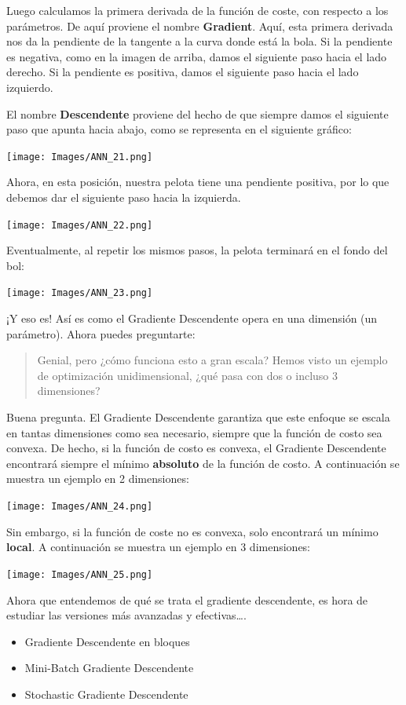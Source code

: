 \documentclass[
]{book}
\providecommand{\tightlist}{%
  \setlength{\itemsep}{0pt}\setlength{\parskip}{0pt}}
\begin{document}
Luego calculamos la primera derivada de la función de coste, con respecto a los parámetros. De aquí proviene el nombre \textbf{Gradient}. Aquí, esta primera derivada nos da la pendiente de la tangente a la curva donde está la bola. Si la pendiente es negativa, como en la imagen de arriba, damos el siguiente paso hacia el lado derecho. Si la pendiente es positiva, damos el siguiente paso hacia el lado izquierdo.

El nombre \textbf{Descendente} proviene del hecho de que siempre damos el siguiente paso que apunta hacia abajo, como se representa en el siguiente gráfico:

\texttt{[image: Images/ANN\_21.png]}

Ahora, en esta posición, nuestra pelota tiene una pendiente positiva, por lo que debemos dar el siguiente paso hacia la izquierda.

\texttt{[image: Images/ANN\_22.png]}

Eventualmente, al repetir los mismos pasos, la pelota terminará en el fondo del bol:

\texttt{[image: Images/ANN\_23.png]}

¡Y eso es! Así es como el Gradiente Descendente opera en una dimensión (un parámetro). Ahora puedes preguntarte:

\begin{quote}
Genial, pero ¿cómo funciona esto a gran escala? Hemos visto un ejemplo de optimización unidimensional, ¿qué pasa con dos o incluso 3 dimensiones?
\end{quote}

Buena pregunta. El Gradiente Descendente garantiza que este enfoque se escala en tantas dimensiones como sea necesario, siempre que la función de costo sea convexa. De hecho, si la función de costo es convexa, el Gradiente Descendente encontrará siempre el mínimo \textbf{absoluto} de la función de costo. A continuación se muestra un ejemplo en 2 dimensiones:

\texttt{[image: Images/ANN\_24.png]}

Sin embargo, si la función de coste no es convexa, solo encontrará un mínimo \textbf{local}. A continuación se muestra un ejemplo en 3 dimensiones:

\texttt{[image: Images/ANN\_25.png]}

Ahora que entendemos de qué se trata el gradiente descendente, es hora de estudiar las versiones más avanzadas y efectivas\ldots.

\begin{itemize}
\tightlist
\item
  Gradiente Descendente en bloques
\item
  Mini-Batch Gradiente Descendente
\item
  Stochastic Gradiente Descendente
\end{itemize}
\end{document}

